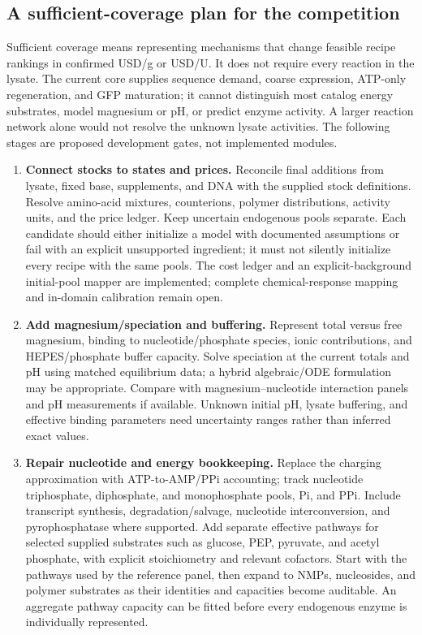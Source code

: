 \subsection{A sufficient-coverage plan for the competition}
Sufficient coverage means representing mechanisms that change feasible recipe
rankings in confirmed USD/g or USD/U. It does not require every reaction in the
lysate. The current core supplies sequence demand, coarse expression, ATP-only
regeneration, and GFP maturation; it cannot distinguish most catalog energy
substrates, model magnesium or pH, or predict enzyme activity. A larger reaction
network alone would not resolve the unknown lysate activities. The following
stages are proposed development gates, not implemented modules.

\begin{enumerate}
\item \textbf{Connect stocks to states and prices.} Reconcile final additions
from lysate, fixed base, supplements, and DNA with the supplied stock definitions.
Resolve amino-acid mixtures, counterions, polymer distributions, activity units,
and the price ledger. Keep uncertain endogenous pools separate. Each candidate
should either initialize a model with documented assumptions or fail with an
explicit unsupported ingredient; it must not silently initialize every recipe
with the same pools. The cost ledger and an explicit-background initial-pool mapper are implemented;
complete chemical-response mapping and in-domain calibration remain open.

\item \textbf{Add magnesium/speciation and buffering.} Represent total versus
free magnesium, binding to nucleotide/phosphate species, ionic contributions,
and HEPES/phosphate buffer capacity. Solve speciation at the current totals and
pH using matched equilibrium data; a hybrid algebraic/ODE formulation may be
appropriate. Compare with magnesium--nucleotide interaction panels and pH
measurements if available. Unknown initial pH, lysate buffering, and effective
binding parameters need uncertainty ranges rather than inferred exact values.

\item \textbf{Repair nucleotide and energy bookkeeping.} Replace the charging
approximation with ATP-to-AMP/PPi accounting; track nucleotide triphosphate,
diphosphate, and monophosphate pools, Pi, and PPi. Include transcript synthesis,
degradation/salvage, nucleotide interconversion, and pyrophosphatase where
supported. Add separate effective pathways for selected supplied substrates
such as glucose, PEP, pyruvate, and acetyl phosphate, with explicit stoichiometry
and relevant cofactors\cite{horvath,hunt}. Start with the pathways used by the
reference panel, then expand to NMPs, nucleosides, and polymer substrates as
their identities and capacities become auditable. An aggregate pathway capacity
can be fitted before every endogenous enzyme is individually represented.


\end{enumerate}
